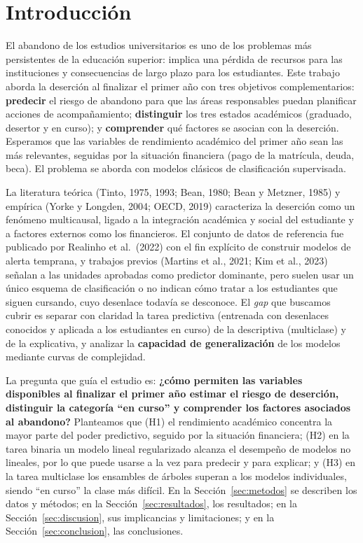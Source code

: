 \documentclass[titlepage,a4paper]{article}
\begin{document}
\section{Introducción}\label{sec:introduccion}

El abandono de los estudios universitarios es uno de los problemas más persistentes de la educación superior: implica una pérdida de recursos para las instituciones y consecuencias de largo plazo para los estudiantes. Este trabajo aborda la deserción al finalizar el primer año con tres objetivos complementarios: \textbf{predecir} el riesgo de abandono para que las áreas responsables puedan planificar acciones de acompañamiento; \textbf{distinguir} los tres estados académicos (graduado, desertor y en curso); y \textbf{comprender} qué factores se asocian con la deserción. Esperamos que las variables de rendimiento académico del primer año sean las más relevantes, seguidas por la situación financiera (pago de la matrícula, deuda, beca). El problema se aborda con modelos clásicos de clasificación supervisada.

La literatura teórica (Tinto, 1975, 1993; Bean, 1980; Bean y Metzner, 1985) y empírica (Yorke y Longden, 2004; OECD, 2019) caracteriza la deserción como un fenómeno multicausal, ligado a la integración académica y social del estudiante y a factores externos como los financieros. El conjunto de datos de referencia fue publicado por Realinho et al.\ (2022) con el fin explícito de construir modelos de alerta temprana, y trabajos previos (Martins et al., 2021; Kim et al., 2023) señalan a las unidades aprobadas como predictor dominante, pero suelen usar un único esquema de clasificación o no indican cómo tratar a los estudiantes que siguen cursando, cuyo desenlace todavía se desconoce. El \textit{gap} que buscamos cubrir es separar con claridad la tarea predictiva (entrenada con desenlaces conocidos y aplicada a los estudiantes en curso) de la descriptiva (multiclase) y de la explicativa, y analizar la \textbf{capacidad de generalización} de los modelos mediante curvas de complejidad.

La pregunta que guía el estudio es: \textbf{¿cómo permiten las variables disponibles al finalizar el primer año estimar el riesgo de deserción, distinguir la categoría ``en curso'' y comprender los factores asociados al abandono?} Planteamos que (H1) el rendimiento académico concentra la mayor parte del poder predictivo, seguido por la situación financiera; (H2) en la tarea binaria un modelo lineal regularizado alcanza el desempeño de modelos no lineales, por lo que puede usarse a la vez para predecir y para explicar; y (H3) en la tarea multiclase los ensambles de árboles superan a los modelos individuales, siendo ``en curso'' la clase más difícil. En la Sección~\ref{sec:metodos} se describen los datos y métodos; en la Sección~\ref{sec:resultados}, los resultados; en la Sección~\ref{sec:discusion}, sus implicancias y limitaciones; y en la Sección~\ref{sec:conclusion}, las conclusiones.
\end{document}
